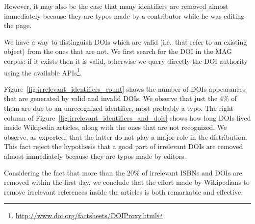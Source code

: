 However, it may also be the case that many identifiers are removed almost immediately because they are typos made by a contributor while he was editing the page.

We have a way to distinguish \acp{DOI} which are valid (i.e.\ that refer to an existing object) from the ones that are not.
We first search for the DOI in the MAG corpus: if it exists then it is valid, otherwise we query directly the DOI authority using the available APIs\footnote{\url{http://www.doi.org/factsheets/DOIProxy.html}}.


Figure~\ref{fig:irrelevant_identifiers_count} shows the number of \acp{DOI} appearances that are generated by valid and invalid DOIs.
We observe that just the 4\% of them are due to an unrecognized identifier, most probably a typo.
The right column of Figure~\ref{fig:irrelevant_identifiers_and_dois} shows how long DOIs lived inside Wikipedia articles, along with the ones that are not recognized.
We observe, as expected, that the latter do not play a major role in the distribution.
This fact reject the hypothesis that a good part of irrelevant DOIs are removed almost immediately because they are typos made by editors.

Considering the fact that more than the 20\% of irrelevant \acp{ISBN} and \acp{DOI} are removed within the first day, we conclude that the effort made by Wikipedians to remove irrelevant references inside the articles is both remarkable and effective.

